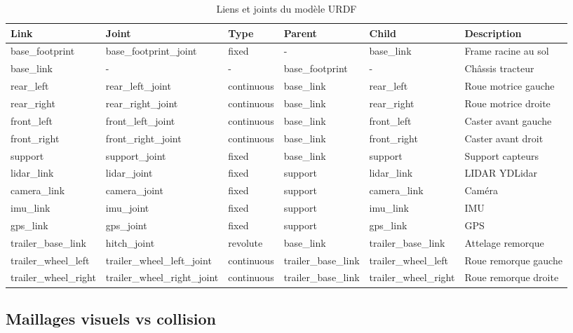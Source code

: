 \documentclass[a4paper,12pt]{report}
\begin{document}
\begin{table}[htbp]
\centering
\caption{Liens et joints du modèle URDF}
\label{tab:links_joints}
\begin{tabular}{@{}lllllp{4cm}@{}}
\toprule
\textbf{Link} & \textbf{Joint} & \textbf{Type} & \textbf{Parent} & \textbf{Child} & \textbf{Description} \\
\midrule
base\_footprint & base\_footprint\_joint & fixed & - & base\_link & Frame racine au sol \\
base\_link & - & - & base\_footprint & - & Châssis tracteur \\
rear\_left & rear\_left\_joint & continuous & base\_link & rear\_left & Roue motrice gauche \\
rear\_right & rear\_right\_joint & continuous & base\_link & rear\_right & Roue motrice droite \\
front\_left & front\_left\_joint & continuous & base\_link & front\_left & Caster avant gauche \\
front\_right & front\_right\_joint & continuous & base\_link & front\_right & Caster avant droit \\
support & support\_joint & fixed & base\_link & support & Support capteurs \\
lidar\_link & lidar\_joint & fixed & support & lidar\_link & LIDAR YDLidar \\
camera\_link & camera\_joint & fixed & support & camera\_link & Caméra \\
imu\_link & imu\_joint & fixed & support & imu\_link & IMU \\
gps\_link & gps\_joint & fixed & support & gps\_link & GPS \\
trailer\_base\_link & hitch\_joint & revolute & base\_link & trailer\_base\_link & Attelage remorque \\
trailer\_wheel\_left & trailer\_wheel\_left\_joint & continuous & trailer\_base\_link & trailer\_wheel\_left & Roue remorque gauche \\
trailer\_wheel\_right & trailer\_wheel\_right\_joint & continuous & trailer\_base\_link & trailer\_wheel\_right & Roue remorque droite \\
\bottomrule
\end{tabular}
\end{table}

\subsection{Maillages visuels vs collision}
\end{document}
